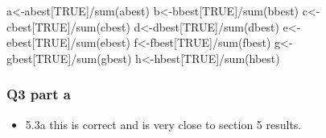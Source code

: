 \documentclass[
]{book}
\newenvironment{Shaded}{\begin{snugshade}}{\end{snugshade}}
\newcommand{\FunctionTok}[1]{\textcolor[rgb]{0.00,0.00,0.00}{#1}}
\newcommand{\NormalTok}[1]{#1}
\newcommand{\OtherTok}[1]{\textcolor[rgb]{0.56,0.35,0.01}{#1}}
\newcommand{\SpecialCharTok}[1]{\textcolor[rgb]{0.00,0.00,0.00}{#1}}
\newcommand{\StringTok}[1]{\textcolor[rgb]{0.31,0.60,0.02}{#1}}
\providecommand{\tightlist}{%
  \setlength{\itemsep}{0pt}\setlength{\parskip}{0pt}}
\theoremstyle{definition}
\theoremstyle{definition}
\theoremstyle{definition}
\theoremstyle{definition}
\theoremstyle{remark}
\begin{document}
\begin{Shaded}
\begin{Highlighting}[]
\NormalTok{  a}\OtherTok{\textless{}{-}}\NormalTok{abest[}\StringTok{\textquotesingle{}TRUE\textquotesingle{}}\NormalTok{]}\SpecialCharTok{/}\FunctionTok{sum}\NormalTok{(abest)}
\NormalTok{  b}\OtherTok{\textless{}{-}}\NormalTok{bbest[}\StringTok{\textquotesingle{}TRUE\textquotesingle{}}\NormalTok{]}\SpecialCharTok{/}\FunctionTok{sum}\NormalTok{(bbest)}
\NormalTok{  c}\OtherTok{\textless{}{-}}\NormalTok{cbest[}\StringTok{\textquotesingle{}TRUE\textquotesingle{}}\NormalTok{]}\SpecialCharTok{/}\FunctionTok{sum}\NormalTok{(cbest)}
\NormalTok{  d}\OtherTok{\textless{}{-}}\NormalTok{dbest[}\StringTok{\textquotesingle{}TRUE\textquotesingle{}}\NormalTok{]}\SpecialCharTok{/}\FunctionTok{sum}\NormalTok{(dbest)}
\NormalTok{  e}\OtherTok{\textless{}{-}}\NormalTok{ebest[}\StringTok{\textquotesingle{}TRUE\textquotesingle{}}\NormalTok{]}\SpecialCharTok{/}\FunctionTok{sum}\NormalTok{(ebest)}
\NormalTok{  f}\OtherTok{\textless{}{-}}\NormalTok{fbest[}\StringTok{\textquotesingle{}TRUE\textquotesingle{}}\NormalTok{]}\SpecialCharTok{/}\FunctionTok{sum}\NormalTok{(fbest)}
\NormalTok{  g}\OtherTok{\textless{}{-}}\NormalTok{gbest[}\StringTok{\textquotesingle{}TRUE\textquotesingle{}}\NormalTok{]}\SpecialCharTok{/}\FunctionTok{sum}\NormalTok{(gbest)}
\NormalTok{  h}\OtherTok{\textless{}{-}}\NormalTok{hbest[}\StringTok{\textquotesingle{}TRUE\textquotesingle{}}\NormalTok{]}\SpecialCharTok{/}\FunctionTok{sum}\NormalTok{(hbest)}
\end{Highlighting}
\end{Shaded}

\hypertarget{q3-part-a}{%
\subsubsection{Q3 part a}\label{q3-part-a}}

\begin{itemize}
\tightlist
\item
  5.3a this is correct and is very close to section 5 results.
\end{itemize}
\end{document}
